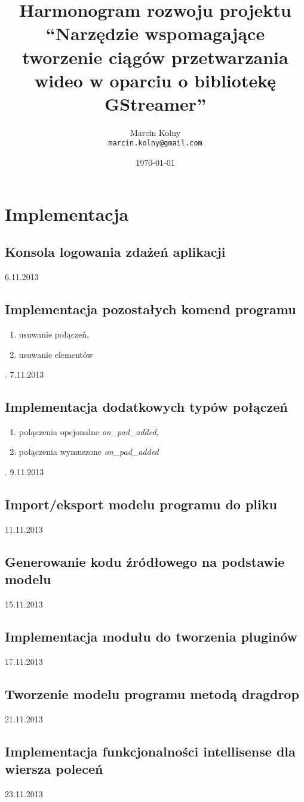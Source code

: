 \documentclass[titlepage]{article}
\title{Harmonogram rozwoju projektu 
\newline\textquotedblleft Narzędzie wspomagające tworzenie
ciągów przetwarzania wideo w oparciu o bibliotekę GStreamer\textquotedblright}
\author{Marcin Kolny\\
\texttt{marcin.kolny@gmail.com}}
\date{\today}
\begin{document}
\pagestyle{plain}
\maketitle
\tableofcontents
\cleardoublepage
\section{Implementacja}
\subsection{Konsola logowania zdażeń aplikacji}
6.11.2013
\subsection{Implementacja pozostałych komend programu}
\begin{enumerate}
  \item usuwanie połączeń,
  \item usuwanie elementów
\end{enumerate}.
7.11.2013
\subsection{Implementacja dodatkowych typów połączeń}
\begin{enumerate}
  \item połączenia opcjonalne \textit{on\_pad\_added},
  \item połączenia wymuszone \textit{on\_pad\_added}
\end{enumerate}.
9.11.2013
\subsection{Import/eksport modelu programu do pliku}
11.11.2013
\subsection{Generowanie kodu źródłowego na podstawie modelu}
15.11.2013
\subsection{Implementacja modułu do tworzenia pluginów}
17.11.2013
\subsection{Tworzenie modelu programu metodą dragdrop}
21.11.2013
\subsection{Implementacja funkcjonalności intellisense dla wiersza poleceń}
23.11.2013
\end{document}
